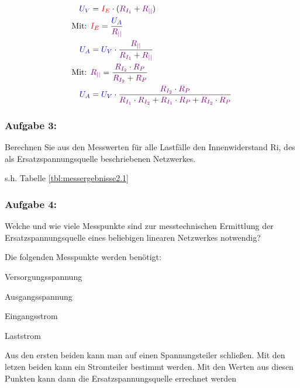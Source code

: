 \documentclass[11pt,a4paper,titlepage]{scrreprt}
\begin{document}
            \begin{align*}
                \textcolor{blue}{U_V} &= \textcolor{red}{I_E} \cdot (\textcolor{violet}{R_{I_1}} + \textcolor{violet}{R_{||}})\\
                \text{Mit: }&  \textcolor{red}{I_E} = \frac{\textcolor{blue}{U_A}}{\textcolor{violet}{R_{||}}}\\
                \textcolor{blue}{U_A} &= \textcolor{blue}{U_V} \cdot \frac{\textcolor{violet}{R_{||}}}{\textcolor{violet}{R_{I_1}} + \textcolor{violet}{R_{||}}}\\
                \text{Mit: }& \textcolor{violet}{R_{||}} = \frac{\textcolor{violet}{R_{I_2}} \cdot \textcolor{violet}{R_P}}{\textcolor{violet}{R_{I_2}} + \textcolor{violet}{R_P}}\\
                \textcolor{blue}{U_A} &= \textcolor{blue}{U_V} \cdot \frac{\textcolor{violet}{R_{I_2}} \cdot \textcolor{violet}{R_P}}{\textcolor{violet}{R_{I_1}} \cdot \textcolor{violet}{R_{I_2}} + \textcolor{violet}{R_{I_1}} \cdot \textcolor{violet}{R_P} + \textcolor{violet}{R_{I_2}} \cdot \textcolor{violet}{R_P}}
            \end{align*}

           \subsubsection{Aufgabe 3:} Berechnen Sie aus den Messwerten für alle Lastfälle den Innenwiderstand Ri, des als Ersatzspannungsquelle beschriebenen Netzwerkes.
           
           s.h. Tabelle \ref{tbl:messergebnisse2.1}
           
           \subsubsection{Aufgabe 4:} Welche und wie viele Messpunkte sind zur messtechnischen Ermittlung der Ersatzspannungsquelle eines beliebigen linearen Netzwerkes notwendig?
           
           Die folgenden Messpunkte werden benötigt:
           \begin{itemize*}
               \item Versorgungsspannung
               \item Ausgangsspannung
               \item Eingangsstrom
               \item Laststrom
            \end{itemize*}
            Aus den ersten beiden kann man auf einen Spannungsteiler schließen. Mit den letzen beiden kann ein Stromteiler bestimmt werden. Mit den Werten aus diesen Punkten kann dann die Ersatzspannungsquelle errechnet werden
\end{document}
